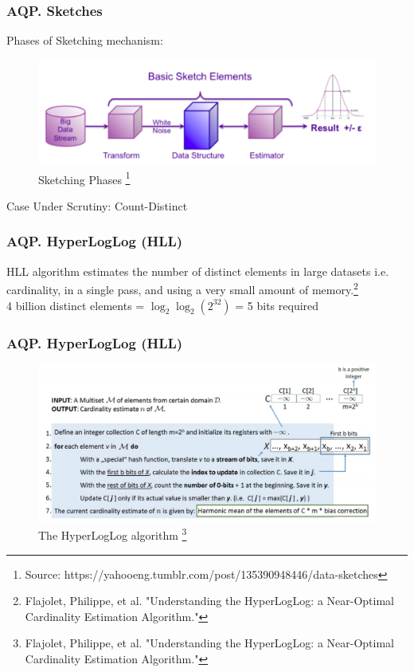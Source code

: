 \documentclass{beamer}
\begin{document}
\begin{frame}
\frametitle{AQP. Sketches}
Phases of Sketching mechanism:
\begin{figure}
  \centering
  \includegraphics[scale=0.30]{img/distinct_count_sketches.png}
  \caption{Sketching Phases \footnote{\fontsize{3}{5}\selectfont Source: https://yahooeng.tumblr.com/post/135390948446/data-sketches}}
  \end{figure}
  Case Under Scrutiny: Count-Distinct
\end{frame}

\begin{frame}
\frametitle{AQP. HyperLogLog (HLL)}
HLL algorithm estimates the number of distinct elements in large datasets i.e. cardinality, in a single pass, and using a very small amount of memory.\footnote{\fontsize{3}{5}\selectfont Flajolet, Philippe, et al. "Understanding the HyperLogLog: a Near-Optimal Cardinality Estimation Algorithm."}\\
\vspace{0.2cm}
4 billion distinct elements = ${\log_2{\log_2(2^{32})}}$ = 5 bits required 
\end{frame}

\begin{frame}
\frametitle{AQP. HyperLogLog (HLL)}
\begin{figure}
  \centering
  \includegraphics[scale=0.38]{img/HLL.png}
  \caption{ The HyperLogLog algorithm \footnote{\fontsize{3}{5}\selectfont Flajolet, Philippe, et al. "Understanding the HyperLogLog: a Near-Optimal Cardinality Estimation Algorithm."}}
  \end{figure}
\end{frame}
\end{document}
